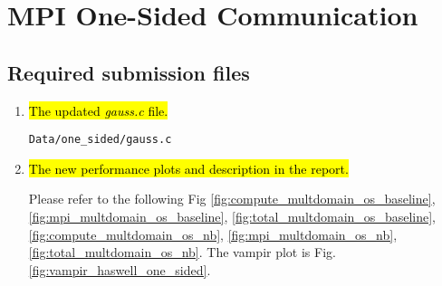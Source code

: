 \section{MPI One-Sided Communication}
\subsection{Required submission files}
\begin{enumerate}
  \item \hl{The updated \emph{gauss.c} file.}

    \verb!Data/one_sided/gauss.c!

  \item \hl{The new performance plots and description in the report.}

	Please refer to the following Fig \ref{fig:compute_multdomain_os_baseline}, \ref{fig:mpi_multdomain_os_baseline}, \ref{fig:total_multdomain_os_baseline}, \ref{fig:compute_multdomain_os_nb}, \ref{fig:mpi_multdomain_os_nb}, \ref{fig:total_multdomain_os_nb}. The vampir plot is Fig. \ref{fig:vampir_haswell_one_sided}.

\end{enumerate}

